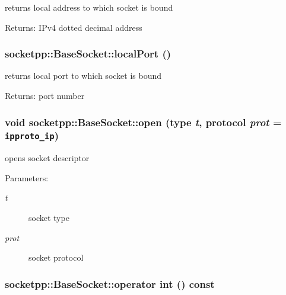 returns local address to which socket is bound 

\begin{Desc}
\item[Returns:]IPv4 dotted decimal address \end{Desc}
\hypertarget{classsocketpp_1_1BaseSocket_d4a2c0e4932436ef61f911514385d16c}{
\subsubsection[{localPort}]{ socketpp::BaseSocket::localPort ()}}
\label{classsocketpp_1_1BaseSocket_d4a2c0e4932436ef61f911514385d16c}


returns local port to which socket is bound 

\begin{Desc}
\item[Returns:]port number \end{Desc}
\hypertarget{classsocketpp_1_1BaseSocket_2060dc1b648f83f8bf5ae3d9ecfcd619}{
\subsubsection[{open}]{\setlength{\rightskip}{0pt plus 5cm}void socketpp::BaseSocket::open ({\bf type} {\em t}, \/  {\bf protocol} {\em prot} = {\tt ipproto\_\-ip})}}
\label{classsocketpp_1_1BaseSocket_2060dc1b648f83f8bf5ae3d9ecfcd619}


opens socket descriptor 

\begin{Desc}
\item[Parameters:]
\begin{description}
\item[{\em t}]socket type \item[{\em prot}]socket protocol \end{description}
\end{Desc}
\hypertarget{classsocketpp_1_1BaseSocket_fa397f810462fe61238dbbf2d9c42c90}{
\subsubsection[{operator int}]{\setlength{\rightskip}{0pt plus 5cm}socketpp::BaseSocket::operator int () const}}
\label{classsocketpp_1_1BaseSocket_fa397f810462fe61238dbbf2d9c42c90}


